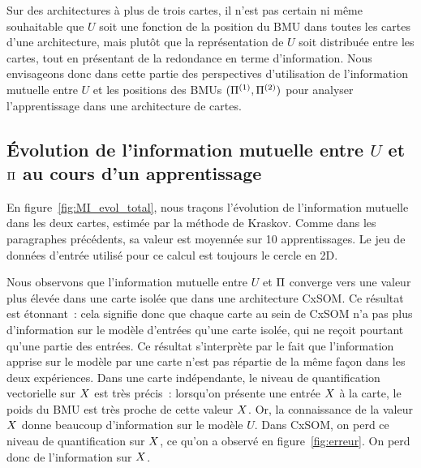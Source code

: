 \documentclass[../main]{subfiles}
\begin{document}
Sur des architectures à plus de trois cartes, il n'est pas certain ni même souhaitable que $U$ soit une fonction de la position du BMU dans toutes les cartes d'une architecture, mais plutôt que la représentation de $U$ soit distribuée entre les cartes, tout en présentant de la redondance en terme d'information.
Nous envisageons donc dans cette partie des perspectives d'utilisation de l'information mutuelle entre $U$ et les positions des BMUs $(\Pi^{({1})}, \Pi^{({2})})$ pour analyser l'apprentissage dans une architecture de cartes.

\subsection{\'Evolution de l'information mutuelle entre $U$ et $\Pi$ au cours d'un apprentissage}

En figure~\ref{fig:MI_evol_total}, nous traçons l'évolution de l'information mutuelle dans les deux cartes, estimée par la méthode de Kraskov. Comme dans les paragraphes précédents, sa valeur est moyennée sur 10 apprentissages.
Le jeu de données d'entrée utilisé pour ce calcul est toujours le cercle en 2D.

Nous observons que l'information mutuelle entre $U$ et $\Pi$ converge vers une valeur plus élevée dans une carte isolée que dans une architecture CxSOM.
Ce résultat est étonnant~: cela signifie donc que chaque carte au sein de CxSOM n'a pas plus d'information sur le modèle d'entrées qu'une carte isolée, qui ne reçoit pourtant qu'une partie des entrées.
Ce résultat s'interprète par le fait que l'information apprise sur le modèle par une carte n'est pas répartie de la même façon dans les deux expériences.
Dans une carte indépendante, le niveau de quantification vectorielle sur $X$ est très précis~: lorsqu'on présente une entrée $X$ à la carte, le poids du BMU est très proche de cette valeur $X$. 
Or, la connaissance de la valeur $X$ donne beaucoup d'information sur le modèle $U$.
Dans CxSOM, on perd ce niveau de quantification sur $X$, ce qu'on a observé en figure~\ref{fig:erreur}. On perd donc de l'information sur $X$.
\end{document}
